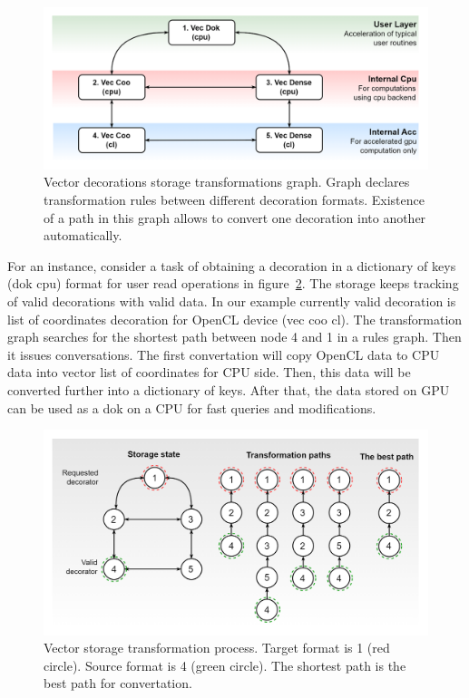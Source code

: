 \begin{figure}
    \centering
    \includegraphics[width=1.0\textwidth]{images/spla_storage_transformation_graph.png}
    \caption{Vector decorations storage transformations graph. Graph declares transformation rules between different decoration formats. Existence of a path in this graph allows to convert one decoration into another automatically.}
    \label{fig:vec_storage_graph}
\end{figure}

For an instance, consider a task of obtaining a decoration in a dictionary of keys (dok cpu) format for user read operations in figure~\ref{fig:vec_transform_path}. The storage keeps tracking of valid decorations with valid data. In our example currently valid decoration is list of coordinates decoration for OpenCL device (vec coo cl). The transformation graph searches for the shortest path between node 4 and 1 in a rules graph. Then it issues conversations. The first convertation will copy OpenCL data to CPU data into vector list of coordinates for CPU side. Then, this data will be converted further into a dictionary of keys. After that, the data stored on GPU can be used as a dok on a CPU for fast queries and modifications.

\begin{figure}
    \centering
    \includegraphics[width=1.0\textwidth]{images/spla_storage_transformation.png}
    \caption{Vector storage transformation process. Target format is 1 (red circle). Source format is 4 (green circle). The shortest path is the best path for convertation.}
    \label{fig:vec_transform_path}
\end{figure}

